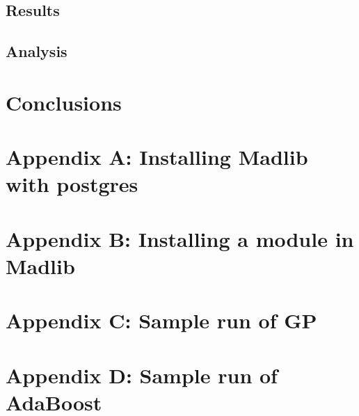 \documentclass[10pt]{article}
\begin{document}
\subsection{Results}
\subsection{Analysis}
\section{Conclusions}




\section*{Appendix A: Installing Madlib with postgres}
\section*{Appendix B: Installing a module in Madlib}
\section*{Appendix C: Sample run of GP}
\section*{Appendix D: Sample run of AdaBoost}
\end{document}

